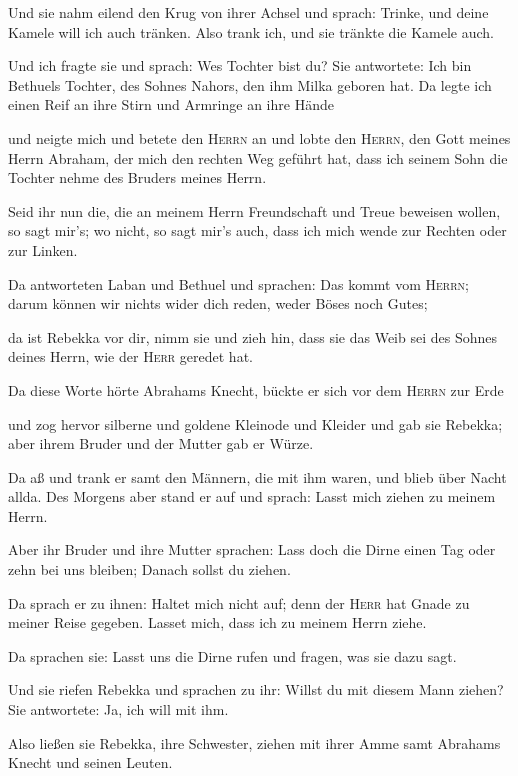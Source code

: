  Und sie nahm eilend den Krug von ihrer Achsel und
sprach: Trinke, und deine Kamele will ich auch tränken. Also trank ich,
und sie tränkte die Kamele auch.

 Und ich fragte sie und sprach: Wes Tochter bist du? Sie
antwortete: Ich bin Bethuels Tochter, des Sohnes Nahors, den ihm Milka
geboren hat. Da legte ich einen Reif an ihre Stirn und Armringe an ihre
Hände

 und neigte mich und betete den \textsc{Herrn} an und
lobte den \textsc{Herrn}, den Gott meines Herrn Abraham, der mich den
rechten Weg geführt hat, dass ich seinem Sohn die Tochter nehme des
Bruders meines Herrn.

 Seid ihr nun die, die an meinem Herrn Freundschaft und
Treue beweisen wollen, so sagt mir's; wo nicht, so sagt mir's auch, dass
ich mich wende zur Rechten oder zur Linken.

 Da antworteten Laban und Bethuel und sprachen: Das kommt
vom \textsc{Herrn}; darum können wir nichts wider dich reden, weder
Böses noch Gutes;

 da ist Rebekka vor dir, nimm sie und zieh hin, dass sie
das Weib sei des Sohnes deines Herrn, wie der \textsc{Herr} geredet hat.

 Da diese Worte hörte Abrahams Knecht, bückte er sich vor
dem \textsc{Herrn} zur Erde

 und zog hervor silberne und goldene Kleinode und Kleider
und gab sie Rebekka; aber ihrem Bruder und der Mutter gab er Würze.

 Da aß und trank er samt den Männern, die mit ihm waren,
und blieb über Nacht allda. Des Morgens aber stand er auf und sprach:
Lasst mich ziehen zu meinem Herrn.

 Aber ihr Bruder und ihre Mutter sprachen: Lass doch die
Dirne einen Tag oder zehn bei uns bleiben; Danach sollst du ziehen.

 Da sprach er zu ihnen: Haltet mich nicht auf; denn der
\textsc{Herr} hat Gnade zu meiner Reise gegeben. Lasset mich, dass ich
zu meinem Herrn ziehe.

 Da sprachen sie: Lasst uns die Dirne rufen und fragen,
was sie dazu sagt.

 Und sie riefen Rebekka und sprachen zu ihr: Willst du
mit diesem Mann ziehen? Sie antwortete: Ja, ich will mit ihm.

 Also ließen sie Rebekka, ihre Schwester, ziehen mit
ihrer Amme samt Abrahams Knecht und seinen Leuten.

